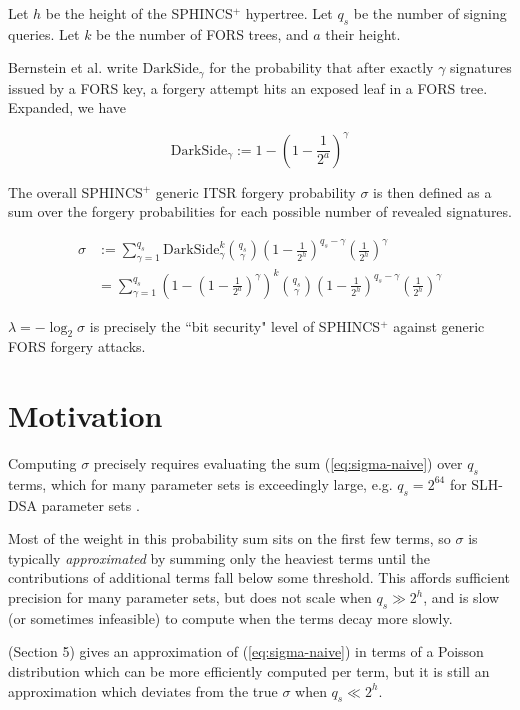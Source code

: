 \documentclass[11pt]{article}
\newcommand{\spx}{SPHINCS$^+$\xspace}
\begin{document}
\bigskip

Let $h$ be the height of the \spx hypertree. Let $q_s$ be the number of signing queries. Let $k$ be the number of FORS trees, and $a$ their height.

Bernstein et al. write $\mathrm{DarkSide}_\gamma$ for the probability that after exactly $\gamma$ signatures issued by a FORS key, a forgery attempt hits an exposed leaf in a FORS tree. Expanded, we have

\begin{equation}
  \mathrm{DarkSide}_\gamma := 1 - \left( 1 - \frac{1}{2^a} \right)^\gamma
\end{equation}

The overall \spx generic ITSR forgery probability $\sigma$ is then defined as a sum over the forgery probabilities for each possible number of revealed signatures.

\begin{align}
\label{eq:sigma-naive}
  \sigma &:= \sum_{\gamma=1}^{q_s} \mathrm{DarkSide}^k_\gamma \binom{q_s}{\gamma} \left( 1 - \frac{1}{2^h} \right)^{q_s - \gamma} \left( \frac{1}{2^{h}} \right)^\gamma \\
  &= \sum_{\gamma=1}^{q_s} \left( 1 - \left( 1 - \frac{1}{2^a} \right)^\gamma \right)^k \binom{q_s}{\gamma} \left( 1 - \frac{1}{2^h} \right)^{q_s - \gamma} \left( \frac{1}{2^{h}} \right)^\gamma
\end{align}

$\lambda = -\log_2 \sigma$ is precisely the ``bit security" level of \spx against generic FORS forgery attacks.

\section{Motivation}

Computing $\sigma$ precisely requires evaluating the sum (\ref{eq:sigma-naive}) over $q_s$ terms, which for many parameter sets is exceedingly large, e.g. $q_s = 2^{64}$ for SLH-DSA parameter sets \cite{fips205}.

Most of the weight in this probability sum sits on the first few terms, so $\sigma$ is typically \emph{approximated} by summing only the heaviest terms until the contributions of additional terms fall below some threshold. This affords sufficient precision for many parameter sets, but does not scale when $q_s \gg 2^h$, and is slow (or sometimes infeasible) to compute when the terms decay more slowly.

\cite{smaller_sphincs} (Section 5) gives an approximation of (\ref{eq:sigma-naive}) in terms of a Poisson distribution which can be more efficiently computed per term, but it is still an approximation which deviates from the true $\sigma$ when $q_s \ll 2^h$.
\end{document}
